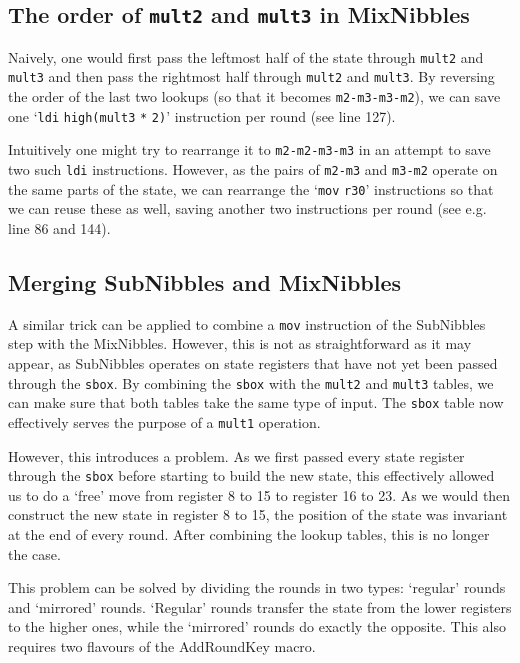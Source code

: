 \documentclass[a4paper]{article}
\begin{document}
\subsection*{The order of \texttt{mult2} and \texttt{mult3} in MixNibbles}

Naively, one would first pass the leftmost half of the state through \texttt{mult2} and \texttt{mult3} and then pass the rightmost half through \texttt{mult2} and \texttt{mult3}. By reversing the order of the last two lookups (so that it becomes \texttt{m2-m3-m3-m2}), we can save one `\texttt{ldi} \texttt{high(mult3} \texttt{*} \texttt{2)}' instruction per round (see line 127).

Intuitively one might try to rearrange it to \texttt{m2-m2-m3-m3} in an attempt to save two such \texttt{ldi} instructions. However, as the pairs of \texttt{m2-m3} and \texttt{m3-m2} operate on the same parts of the state, we can rearrange the `\texttt{mov} \texttt{r30}' instructions so that we can reuse these as well, saving another two instructions per round (see e.g. line 86 and 144).

\subsection*{Merging SubNibbles and MixNibbles}

A similar trick can be applied to combine a \texttt{mov} instruction of the SubNibbles step with the MixNibbles. However, this is not as straightforward as it may appear, as SubNibbles operates on state registers that have not yet been passed through the \texttt{sbox}. By combining the \texttt{sbox} with the \texttt{mult2} and \texttt{mult3} tables, we can make sure that both tables take the same type of input. The \texttt{sbox} table now effectively serves the purpose of a \texttt{mult1} operation.

However, this introduces a problem. As we first passed every state register through the \texttt{sbox} before starting to build the new state, this effectively allowed us to do a `free' move from register 8 to 15 to register 16 to 23. As we would then construct the new state in register 8 to 15, the position of the state was invariant at the end of every round. After combining the lookup tables, this is no longer the case.

This problem can be solved by dividing the rounds in two types: `regular' rounds and `mirrored' rounds. `Regular' rounds transfer the state from the lower registers to the higher ones, while the `mirrored' rounds do exactly the opposite. This also requires two flavours of the AddRoundKey macro.
\end{document}
